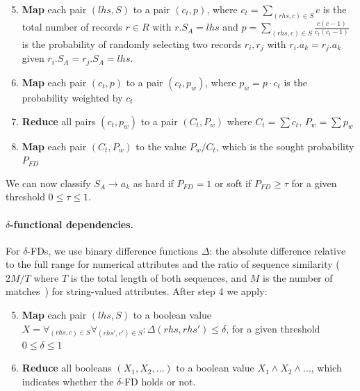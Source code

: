 \documentclass{article}
\begin{document}
    \begin{enumerate}[noitemsep]
        \setcounter{enumi}{4}
        \item \textbf{Map} each pair $(lhs, S)$ to a pair $(c_{t}, p)$, where $\displaystyle c_t = \sum_{(rhs,c) \in S} c$ is the total number of records $r \in R$ with $r.S_A = lhs$ and $\displaystyle p = \sum_{(rhs, c) \in S}\frac{c(c-1)}{c_t(c_t-1)}$ is the probability of randomly selecting two records $r_i, r_j$ with $r_i.a_k = r_j.a_k$ given $r_i.S_A = r_j.S_A = lhs$.
        
        \item \textbf{Map} each pair $(c_t, p)$ to a pair $(c_t, p_w)$, where $p_w = p\cdot c_t$ is the probability weighted by $c_t$
        
        \item \textbf{Reduce} all pairs $(c_t, p_w)$ to a pair $(C_t, P_w)$ where $C_t = \sum c_t$, $P_w = \sum p_w$
        
        \item \textbf{Map} each pair $(C_t, P_w)$ to the value $P_w / C_t$, which is the sought probability $P_{FD}$
    \end{enumerate}

    \noindent We can now classify $S_A \rightarrow a_k$ as hard if $P_{FD} = 1$ or soft if $P_{FD} \geq \tau$ for a given threshold $0 \leq \tau \leq 1$.
    
    \paragraph{\texorpdfstring{$\delta$}{delta}-functional dependencies.}
    For $\delta$-FDs, we use binary difference functions $\Delta$: the absolute difference relative to the full range for numerical attributes and the ratio of sequence similarity ($2M/T$ where $T$ is the total length of both sequences, and $M$ is the number of matches~\cite{difflib}) for string-valued attributes. After step 4 we apply:
    
    \begin{enumerate}[noitemsep]
        \setcounter{enumi}{4}
        \item \textbf{Map} each pair $(lhs, S)$ to a boolean value $X = \forall_{(rhs,c) \in S} \forall_{(rhs', c') \in S} : \Delta(rhs, rhs') \leq \delta$, for a given threshold $0 \leq \delta \leq 1$%
        \item \textbf{Reduce} all booleans $(X_1, X_2, ...)$ to a boolean value $X_1 \wedge X_2 \wedge ...$, which indicates whether the $\delta$-FD holds or not.
    \end{enumerate}
    
\end{document}
